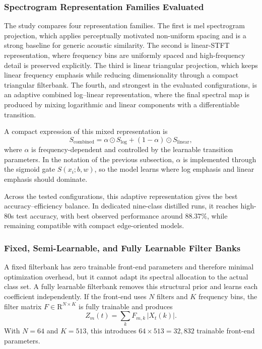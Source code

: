 \documentclass[a4paper,singleside,12pt]{report} %
\begin{document}
	\subsubsection{Spectrogram Representation Families Evaluated}
	The study compares four representation families. The first is mel spectrogram projection, which applies perceptually motivated non-uniform spacing and is a strong baseline for generic acoustic similarity. The second is linear-STFT representation, where frequency bins are uniformly spaced and high-frequency detail is preserved explicitly. The third is linear triangular projection, which keeps linear frequency emphasis while reducing dimensionality through a compact triangular filterbank. The fourth, and strongest in the evaluated configurations, is an adaptive combined log--linear representation, where the final spectral map is produced by mixing logarithmic and linear components with a differentiable transition.

	A compact expression of this mixed representation is
	\begin{equation}
		S_{\mathrm{combined}} = \alpha \odot S_{\log} + (1-\alpha)\odot S_{\mathrm{linear}},
	\end{equation}
	where \(\alpha\) is frequency-dependent and controlled by the learnable transition parameters. In the notation of the previous subsection, \(\alpha\) is implemented through the sigmoid gate \(S(x_i;b,w)\), so the model learns where log emphasis and linear emphasis should dominate.

	Across the tested configurations, this adaptive representation gives the best accuracy--efficiency balance. In dedicated nine-class distilled runs, it reaches high-80s test accuracy, with best observed performance around \(88.37\%\), while remaining compatible with compact edge-oriented models.

	\subsubsection{Fixed, Semi-Learnable, and Fully Learnable Filter Banks}
	A fixed filterbank has zero trainable front-end parameters and therefore minimal optimization overhead, but it cannot adapt its spectral allocation to the actual class set. A fully learnable filterbank removes this structural prior and learns each coefficient independently. If the front-end uses \(N\) filters and \(K\) frequency bins, the filter matrix \(F\in\mathrm{R}^{N\times K}\) is fully trainable and produces
	\begin{equation}
		Z_m(t)=\sum_k F_{m,k}\,|X_t(k)|.
	\end{equation}
	With \(N=64\) and \(K=513\), this introduces \(64\times513=32{,}832\) trainable front-end parameters.
\end{document}
